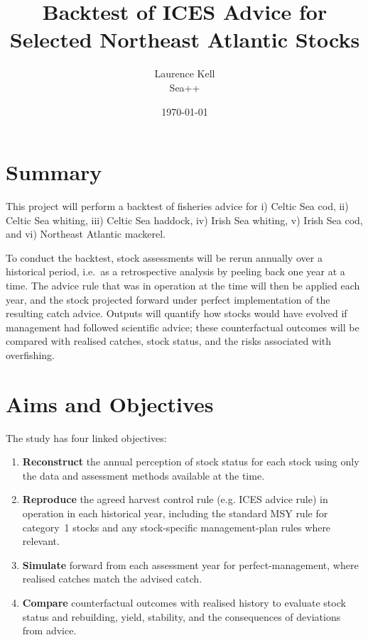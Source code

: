 \documentclass[11pt,a4paper]{extarticle}
\title{Backtest of ICES Advice for Selected Northeast Atlantic Stocks}
\author{%
	Laurence Kell\\
	\small Sea++
}
\date{\small \today}
\begin{document}
	
	\maketitle
	
	\section*{Summary}
	
	This project will perform a backtest of fisheries advice for i) Celtic Sea cod, ii) Celtic Sea whiting, iii) Celtic Sea haddock, iv) Irish Sea whiting, v) Irish Sea cod, and vi) Northeast Atlantic mackerel.
	
	To conduct the backtest, stock assessments will be rerun annually over a historical period, i.e.\ as a retrospective analysis by peeling back one year at a time. The advice rule that was in operation at the time will then be applied each year, and the stock projected forward under perfect implementation of the resulting catch advice. Outputs will quantify how stocks would have evolved if management had followed scientific advice; these counterfactual outcomes will be compared with realised catches, stock status, and the risks associated with overfishing.
	
	\section*{Aims and Objectives}
	
	The study has four linked objectives:
	
	\begin{enumerate}
		\item \textbf{Reconstruct} the annual perception of stock status for each stock using only the data and assessment methods available at the time.
		\item \textbf{Reproduce} the agreed harvest control rule (e.g. ICES advice rule) in operation in each historical year, including the standard MSY rule for category~1 stocks and any stock-specific management-plan rules where relevant.
		\item \textbf{Simulate} forward from each assessment year for perfect-management, where realised catches match the advised catch.
		\item \textbf{Compare} counterfactual outcomes with realised history to evaluate stock status and rebuilding, yield, stability, and the consequences of deviations from advice.
	\end{enumerate}
	
\end{document}
